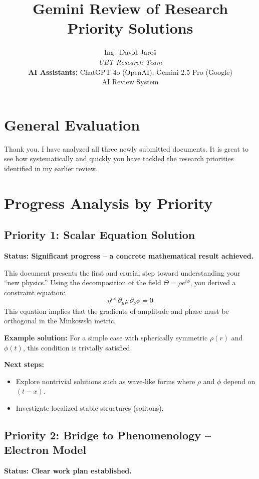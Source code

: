 \documentclass{article}
\title{Gemini Review of Research Priority Solutions}
\author{
Ing.~David Jaroš \\
\textit{UBT Research Team} \\
\textbf{AI Assistants:} ChatGPT-4o (OpenAI), Gemini 2.5 Pro (Google) \\
AI Review System}
\date{}
\begin{document}
\maketitle

\section*{General Evaluation}

Thank you. I have analyzed all three newly submitted documents. It is great to see how systematically and quickly you have tackled the research priorities identified in my earlier review.

\section*{Progress Analysis by Priority}

\subsection*{Priority 1: Scalar Equation Solution}

\textbf{Status: Significant progress – a concrete mathematical result achieved.}

This document presents the first and crucial step toward understanding your ``new physics.'' Using the decomposition of the field $\Theta = \rho e^{i\phi}$, you derived a constraint equation:
\[
\eta^{\mu\nu} \, \partial_\mu \rho \, \partial_\nu \phi = 0
\]
This equation implies that the gradients of amplitude and phase must be orthogonal in the Minkowski metric.

\textbf{Example solution:} For a simple case with spherically symmetric $\rho(r)$ and $\phi(t)$, this condition is trivially satisfied.

\textbf{Next steps:}
\begin{itemize}
\item Explore nontrivial solutions such as wave-like forms where $\rho$ and $\phi$ depend on $(t - x)$.
\item Investigate localized stable structures (solitons).
\end{itemize}

\subsection*{Priority 2: Bridge to Phenomenology – Electron Model}

\textbf{Status: Clear work plan established.}
\end{document}
